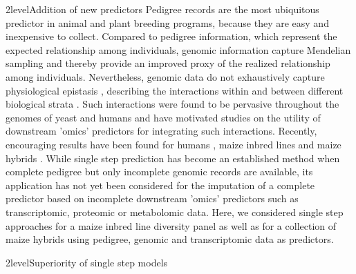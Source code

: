 \documentclass[12pt,titlepage]{article}
\begin{document}
\Genetics2level{Addition of new predictors}
Pedigree records are the most ubiquitous predictor in animal and plant breeding
programs, because they are easy and inexpensive to collect.
Compared to pedigree information, which represent the expected relationship
among individuals, genomic information capture Mendelian sampling and thereby 
provide an improved proxy of the realized relationship among individuals.
Nevertheless, genomic data do not exhaustively capture physiological epistasis 
\cite{Jiang2015,Guo2016,Vazquez2016}, describing the interactions 
within and between different biological strata \cite{Sackton2016}.
Such interactions were found to be pervasive throughout the genomes of yeast 
\cite{Brem2005} and humans \cite{Brown2014} and have motivated studies on the 
utility of downstream 'omics' predictors for integrating such interactions.
Recently, encouraging results have been found for humans \cite{Vazquez2016}, 
maize inbred lines \cite{Guo2016} and maize hybrids \cite{Westhues2017}.
While single step prediction has become an established method when complete
pedigree but only incomplete genomic records are available, its application has
not yet been considered for the imputation of a complete predictor based on 
incomplete downstream 'omics' predictors such as transcriptomic, proteomic or 
metabolomic data.
Here, we considered single step approaches for a maize inbred line diversity
panel as well as for a collection of maize hybrids using pedigree, genomic and
transcriptomic data as predictors. 


\Genetics2level{Superiority of single step models}
\end{document}
